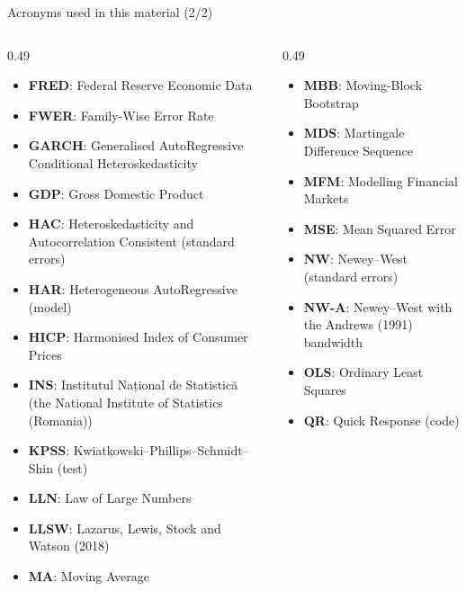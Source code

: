 \begin{frame}{Acronyms used in this material (2/2)}
\begin{columns}[T]
\begin{column}{0.49\textwidth}
\begin{itemize}\setlength{\itemsep}{0pt}
    \item \textbf{FRED}: Federal Reserve Economic Data
    \item \textbf{FWER}: Family-Wise Error Rate
    \item \textbf{GARCH}: Generalised AutoRegressive Conditional Heteroskedasticity
    \item \textbf{GDP}: Gross Domestic Product
    \item \textbf{HAC}: Heteroskedasticity and Autocorrelation Consistent (standard errors)
    \item \textbf{HAR}: Heterogeneous AutoRegressive (model)
    \item \textbf{HICP}: Harmonised Index of Consumer Prices
    \item \textbf{INS}: Institutul Național de Statistică (the National Institute of Statistics (Romania))
    \item \textbf{KPSS}: Kwiatkowski–Phillips–Schmidt–Shin (test)
    \item \textbf{LLN}: Law of Large Numbers
    \item \textbf{LLSW}: Lazarus, Lewis, Stock and Watson (2018)
    \item \textbf{MA}: Moving Average
\end{itemize}
\end{column}
\begin{column}{0.49\textwidth}
\begin{itemize}\setlength{\itemsep}{0pt}
    \item \textbf{MBB}: Moving-Block Bootstrap
    \item \textbf{MDS}: Martingale Difference Sequence
    \item \textbf{MFM}: Modelling Financial Markets
    \item \textbf{MSE}: Mean Squared Error
    \item \textbf{NW}: Newey–West (standard errors)
    \item \textbf{NW-A}: Newey–West with the Andrews (1991) bandwidth
    \item \textbf{OLS}: Ordinary Least Squares
    \item \textbf{QR}: Quick Response (code)

\end{itemize}
\end{column}
\end{columns}
\end{frame}
